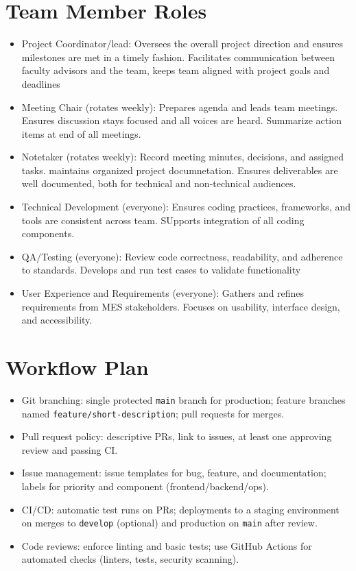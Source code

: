 \documentclass{article}
\begin{document}
\section{Team Member Roles}

\begin{itemize}
  \item Project Coordinator/lead: Oversees the overall project direction and ensures milestones are met in a timely fashion. Facilitates communication between faculty advisors and the team, keeps team aligned with project goals and deadlines
  \item Meeting Chair (rotates weekly): Prepares agenda and leads team meetings. Ensures discussion stays focused and all voices are heard. Summarize action items at end of all meetings.
  \item Notetaker (rotates weekly): Record meeting minutes, decisions, and assigned tasks. maintains organized project documnetation. Ensures deliverables are well documented, both for technical and non-technical audiences.
  \item Technical Development (everyone): Ensures coding practices, frameworks, and tools are consistent across team. SUpports integration of all coding components.
  \item QA/Testing (everyone): Review code correctness, readability, and adherence to standards. Develops and run test cases to validate functionality
  \item User Experience and Requirements (everyone): Gathers and refines requirements from MES stakeholders. Focuses on usability, interface design, and accessibility. 
\end{itemize}

\section{Workflow Plan}

\begin{itemize}
  \item Git branching: single protected \texttt{main} branch for production; feature branches named \texttt{feature/short-description}; pull requests for merges.
  \item Pull request policy: descriptive PRs, link to issues, at least one approving review and passing CI.
  \item Issue management: issue templates for bug, feature, and documentation; labels for priority and component (frontend/backend/ops).
  \item CI/CD: automatic test runs on PRs; deployments to a staging environment on merges to \texttt{develop} (optional) and production on \texttt{main} after review.
  \item Code reviews: enforce linting and basic tests; use GitHub Actions for automated checks (linters, tests, security scanning).
\end{itemize}
\end{document}
